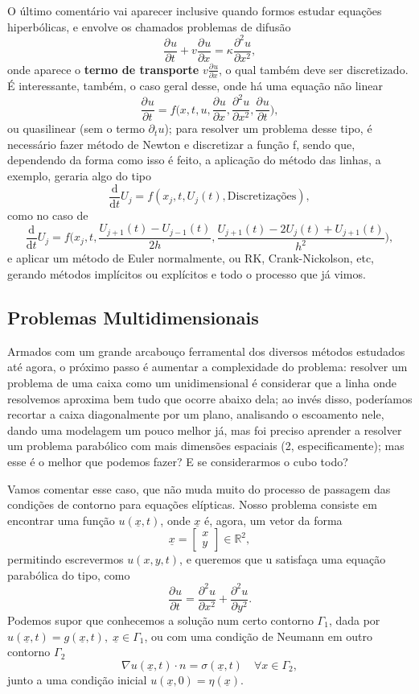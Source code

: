 \documentclass[../differential_methods.tex]{subfiles}
\begin{document}
O último comentário vai aparecer inclusive quando formos estudar equações hiperbólicas, e envolve os chamados problemas de difusão
\[
	\frac{\partial^{}u}{\partial t^{}} + v \frac{\partial^{}u}{\partial x^{}} = \kappa \frac{\partial^{2}u}{\partial x^{2}},
\]
onde aparece o \textbf{termo de transporte} \(\displaystyle v \frac{\partial^{}u}{\partial x^{}}\), o qual também deve ser discretizado. É interessante, também, o caso geral desse, onde há uma equação não linear
\[
	\frac{\partial^{}u}{\partial t^{}}=f\biggl(x, t, u, \frac{\partial^{}u}{\partial x^{}}, \frac{\partial^{2}u}{\partial x^{2}}, \frac{\partial^{}u}{\partial t^{}}\biggr),
\]
ou quasilinear (sem o termo \(\partial_t u\)); para resolver um problema desse tipo, é necessário fazer método de Newton e discretizar a função f, sendo que, dependendo da forma como isso é feito, a aplicação do método das linhas, a exemplo, geraria algo do tipo
\[
	\frac{\mathrm{d}}{\mathrm{d}t}U_{j} = f(x_{j}, t, U_{j}(t), \text{Discretizações}),
\]
como no caso de
\[
	\frac{\mathrm{d}}{\mathrm{d}t}U_{j}=f\biggl(x_{j}, t, \frac{U_{j+1}^{}(t)-U_{j-1}(t)}{2h}, \frac{U_{j+1}(t) - 2U_{j}(t) + U_{j+1}(t)}{h^{2}}\biggr),
\]
e aplicar um método de Euler normalmente, ou RK, Crank-Nickolson, etc, gerando métodos implícitos ou explícitos e todo o processo que já vimos.
\subsection{Problemas Multidimensionais}

Armados com um grande arcabouço ferramental dos diversos métodos estudados até agora, o próximo passo é aumentar a complexidade do problema: resolver um problema de uma caixa como um unidimensional é considerar que a linha onde resolvemos aproxima bem tudo que ocorre abaixo dela; ao invés disso, poderíamos recortar a caixa diagonalmente por um plano, analisando o escoamento nele, dando uma modelagem um pouco melhor já, mas foi preciso aprender a resolver um problema parabólico com mais dimensões espaciais (2, especificamente); mas esse é o melhor que podemos fazer? E se considerarmos o cubo todo?

Vamos comentar esse caso, que não muda muito do processo de passagem das condições de contorno para equações elípticas. Nosso problema consiste em encontrar uma função \(u(\underline{x}, t)\), onde \(\underline{x}\) é, agora, um vetor da forma
\[
	\underline{x}=\begin{bmatrix}
		x \\
		y
	\end{bmatrix}\in \mathbb{R}^{2},
\]
permitindo escrevermos \(u(x, y, t)\), e queremos que u satisfaça uma equação parabólica do tipo, como
\[
	\frac{\partial^{}u}{\partial t^{}} = \frac{\partial^{2}u}{\partial x^{2}} + \frac{\partial^{2}u}{\partial y^{2}}.
\]
Podemos supor que conhecemos a solução num certo contorno \(\Gamma_1\), dada por \(u(\underline{x}, t) = g(\underline{x}, t),\; \underline{x}\in \Gamma_1\), ou com uma condição de Neumann em outro contorno \(\Gamma_2\)
\[
	\nabla u(\underline{x}, t) \cdot n = \sigma (\underline{x}, t) \quad \forall x\in \Gamma_2,
\]
junto a uma condição inicial \(u(\underline{x}, 0)=\eta (\underline{x})\).
\end{document}

